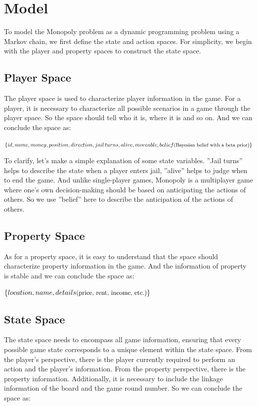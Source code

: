 \documentclass{article}
\begin{document}
\section{Model}
To model the Monopoly problem as a dynamic programming problem using a Markov chain, we first define the state and action spaces. For simplicity, we begin with the player and property spaces to construct the state space.

    \subsection{Player Space}
    The player space is used to characterize player information in the game. For a player, it is necessary to characterize all possible scenarios in a game through the player space. So the space should tell who it is, where it is and so on. And we can conclude the space as:
    
    $\{id, name, money, position, direction, jail\thinspace turns, alive, moveable, belief \footnotesize{\text{(Bayesian belief with a beta prior)}}\}$
    
    To clarify, let's make a simple explanation of some state variables. ''Jail turns'' helps to describe the state when a player enters jail, ''alive'' helps to judge when to end the game. And unlike single-player games, Monopoly is a multiplayer game where one's own decision-making should be based on anticipating the actions of others. So we use ''belief'' here to describe the anticipation of the actions of others.

    \subsection{Property Space}
    As for a property space, it is easy to understand that the space should characterize property information in the game. And the information of property is stable and we can conclude the space as:
    
    $\{location, name, details \footnotesize{\text{(price, rent, income, etc.)}}\}$
    
    \subsection{State Space}
    The state space needs to encompass all game information, ensuring that every possible game state corresponds to a unique element within the state space. From the player's perspective, there is the player currently required to perform an action and the player's information. From the property perspective, there is the property information. Additionally, it is necessary to include the linkage information of the board and the game round number. So we can conclude the space as:
    
\end{document}
